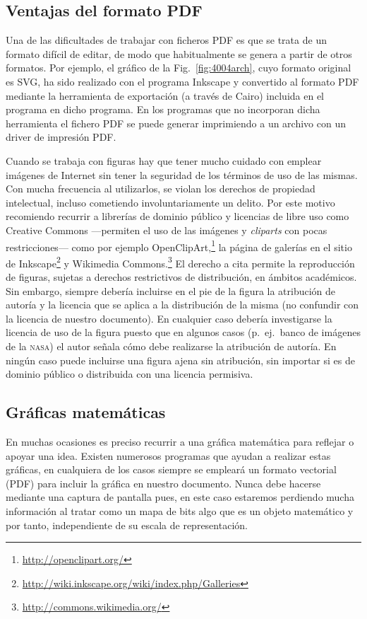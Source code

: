 \documentclass[11pt,a4paper]{article}
\begin{document}
\subsection{Ventajas del formato \textsf{PDF}}
Una de las dificultades de trabajar con ficheros \textsf{PDF} es que se trata de un formato difícil de editar, de modo que habitualmente se genera a partir de otros formatos. Por ejemplo, el gráfico de la Fig.~\ref{fig:4004arch}, cuyo formato original es \textsf{SVG}, ha sido realizado con el programa \textsf{Inkscape} y convertido al formato \textsf{PDF} mediante la herramienta de exportación (a través de \textsf{Cairo}) incluida en el programa en dicho programa. En los programas que no incorporan dicha herramienta el fichero \textsf{PDF} se puede generar imprimiendo a un archivo con un driver de impresión \textsf{PDF}. 

Cuando se trabaja con figuras hay que tener mucho cuidado con emplear imágenes de Internet sin tener la seguridad de los términos de uso de las mismas. Con mucha frecuencia al utilizarlos, se violan los derechos de propiedad intelectual, incluso cometiendo involuntariamente un delito. Por este motivo recomiendo recurrir a librerías de dominio público y licencias de libre uso como Creative Commons ---permiten el uso de las imágenes y \emph{cliparts} con pocas restricciones--- como por ejemplo OpenClipArt,\footnote{\url{http://openclipart.org/}} la página de galerías en el sitio de Inkscape\footnote{\url{http://wiki.inkscape.org/wiki/index.php/Galleries}} y Wikimedia Commons.\footnote{\url{http://commons.wikimedia.org/}} El derecho a cita permite la reproducción de figuras, sujetas a derechos restrictivos de distribución, en ámbitos académicos. Sin embargo, siempre debería incluirse en el pie de la figura la atribución de autoría y la licencia que se aplica a la distribución de la misma (no confundir con la licencia de nuestro documento). En cualquier caso debería investigarse la licencia de uso de la figura puesto que en algunos casos (p.~ej.\ banco de imágenes de la \textsc{nasa}) el autor señala cómo debe realizarse la atribución de autoría. En ningún caso puede incluirse una figura ajena sin atribución, sin importar si es de dominio público o distribuida con una licencia permisiva.







\subsection{Gráficas matemáticas}
En muchas ocasiones es preciso recurrir a una gráfica matemática para reflejar o apoyar una idea. Existen numerosos programas que ayudan a realizar estas gráficas, en cualquiera de los casos siempre se empleará un formato vectorial (\textsf{PDF}) para incluir la gráfica en nuestro documento. Nunca debe hacerse mediante una captura de pantalla pues, en este caso estaremos perdiendo mucha información al tratar como un mapa de bits algo que es un objeto matemático y por tanto, independiente de su escala de representación.
\end{document}
